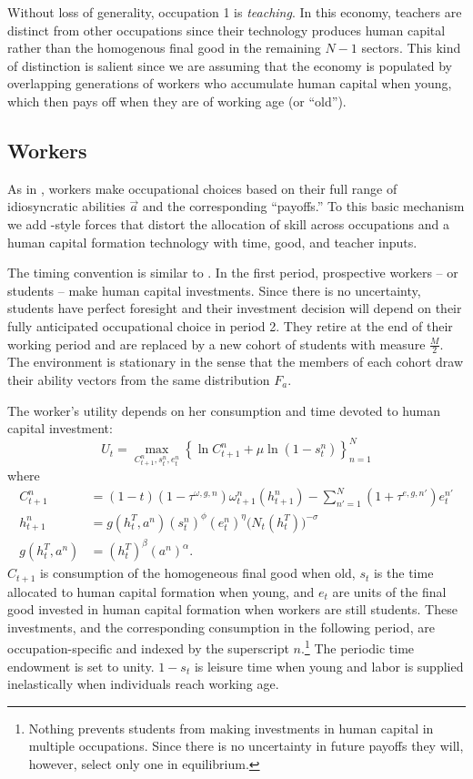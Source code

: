 \documentclass[onehalfspacing,11pt]{article}
\begin{document}
Without loss of generality, occupation 1 is \textit{teaching}. In this economy, teachers are distinct from other occupations since their technology produces human capital rather than the homogenous final good in the remaining $N-1$ sectors. This kind of distinction is salient since we are assuming that the economy is populated by overlapping generations of workers who accumulate human capital when young, which then pays off when they are of working age (or ``old'').
\subsection{Workers}\label{sec:workers}
As in \cite{Roy:1951}, workers make occupational choices based on their full range of idiosyncratic abilities $\vec{a}$ and the corresponding ``payoffs.'' To this basic mechanism we add \cite{Hsieh:2018}-style forces that distort the allocation of skill across occupations and a human capital formation technology with time, good, and teacher inputs.

The timing convention is similar to \cite{Hsieh:2018}. In the first period, prospective workers -- or students -- make human capital investments. Since there is no uncertainty, students have perfect foresight and their investment decision will depend on their fully anticipated occupational choice in period 2. They retire at the end of their working period and are replaced by a new cohort of students with measure $\tfrac{M}{2}$. The environment is stationary in the sense that the members of each cohort draw their ability vectors from the same distribution $F_a$.

The worker's utility depends on her consumption and time devoted to human capital investment:
\begin{equation}
U_t = \max_{C_{t+1}^n,s_t^n,e_t^n} \left\{\ln C_{t+1}^n + \mu\ln\left(1-s_t^n \right) \label{eq:util} \right\}_{n=1}^N
\end{equation}
where
\begin{align}
\label{}
C_{t+1}^n & =(1-t)(1-\tau^{\omega,g,n})\omega_{t+1}^n(h_{t+1}^n)- \sum_{n'=1}^N(1+\tau^{e,g,{n'}})e_{t}^{n'} \label{eq:bc}\\ %
h_{t+1}^n & =g(h_{t}^T,a^n)(s_t^n)^{\phi} (e_t^n)^{\eta}\big(N_t(h_t^T)\big)^{-\sigma} \label{eq:h}\\
g(h_{t}^T,a^n) & =(h_{t}^T)^\beta \left(a^n \right)^\alpha. \label{eq:g(h,a)}
\end{align}
$C_{t+1}$ is consumption of the homogeneous final good when old, $s_t$ is the time allocated to human capital formation when young, and $e_t$ are units of the final good invested in human capital formation when workers are still students. These investments, and the corresponding consumption in the following period, are occupation-specific and indexed by the superscript $n$.\footnote{Nothing prevents students from making investments in human capital in multiple occupations. Since there is no uncertainty in future payoffs they will, however, select only one in equilibrium.} The periodic time endowment is set to unity. $1-s_t$ is leisure time when young and labor is supplied inelastically when individuals reach working age.
\end{document}
